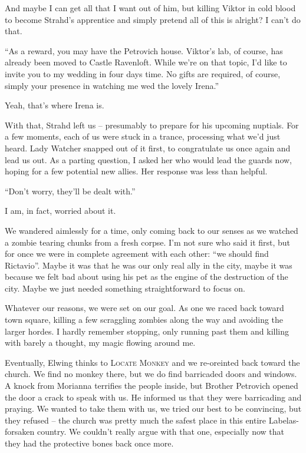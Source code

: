 And maybe I can get all that I want out of him, but killing Viktor in cold blood to become Strahd's apprentice and simply pretend all of this is alright? I can't do that.

``As a reward, you may have the Petrovich house. Viktor's lab, of course, has already been moved to Castle Ravenloft. While we're on that topic, I'd like to invite you to my wedding in four days time. No gifts are required, of course, simply your presence in watching me wed the lovely Irena.''

Yeah, that's where Irena is.

With that, Strahd left us -- presumably to prepare for his upcoming nuptials. For a few moments, each of us were stuck in a trance, processing what we'd just heard. Lady Watcher snapped out of it first, to congratulate us once again and lead us out. As a parting question, I asked her who would lead the guards now, hoping for a few potential new allies. Her response was less than helpful.

``Don't worry, they'll be dealt with.''

I am, in fact, worried about it.

We wandered aimlessly for a time, only coming back to our senses as we watched a zombie tearing chunks from a fresh corpse. I'm not sure who said it first, but for once we were in complete agreement with each other: ``we should find Rictavio''. Maybe it was that he was our only real ally in the city, maybe it was because we felt bad about using his pet as the engine of the destruction of the city. Maybe we just needed something straightforward to focus on.

Whatever our reasons, we were set on our goal. As one we raced back toward town square, killing a few scraggling zombies along the way and avoiding the larger hordes. I hardly remember stopping, only running past them and killing with barely a thought, my magic flowing around me.

Eventually, Elwing thinks to \textsc{Locate Monkey} and we re-oreinted back toward the church. We find no monkey there, but we do find barricaded doors and windows. A knock from Morianna terrifies the people inside, but Brother Petrovich opened the door a crack to speak with us. He informed us that they were barricading and praying. We wanted to take them with us, we tried our best to be convincing, but they refused -- the church was pretty much the safest place in this entire Labelas-forsaken country. We couldn't really argue with that one, especially now that they had the protective bones back once more.

